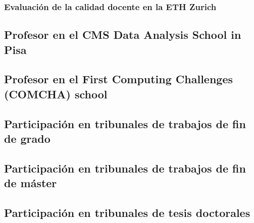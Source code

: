 \documentclass[a4paper, 11pt, twoside, openright]{report}
\begin{document}
\subsubsection{Evaluación de la calidad docente en la ETH Zurich}


\subsection{Profesor en el CMS Data Analysis School in Pisa}


\subsection{Profesor en el First Computing Challenges (COMCHA) school}


\subsection{Participación en tribunales de trabajos de fin de grado}


\subsection{Participación en tribunales de trabajos de fin de máster}


\subsection{Participación en tribunales de tesis doctorales}

\end{document}
